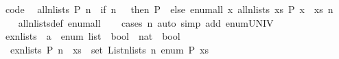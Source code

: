 \begin{isabellebody}
\isanewline
{}\isamarkupfalse%
\ {\isacharbrackleft}{\kern0pt}code{\isacharbrackright}{\kern0pt}{\isacharcolon}{\kern0pt}\isanewline
\ \ {\isachardoublequoteopen}all{\isacharunderscore}{\kern0pt}n{\isacharunderscore}{\kern0pt}lists\ P\ n\ {\isasymlongleftrightarrow}\ {\isacharparenleft}{\kern0pt}if\ n\ {\isacharequal}{\kern0pt}\ {}\ then\ P\ {\isacharbrackleft}{\kern0pt}{\isacharbrackright}{\kern0pt}\ else\ enum{\isacharunderscore}{\kern0pt}all\ {\isacharparenleft}{\kern0pt}{\isacharpercent}{\kern0pt}x{\isachardot}{\kern0pt}\ all{\isacharunderscore}{\kern0pt}n{\isacharunderscore}{\kern0pt}lists\ {\isacharparenleft}{\kern0pt}{\isacharpercent}{\kern0pt}xs{\isachardot}{\kern0pt}\ P\ {\isacharparenleft}{\kern0pt}x\ {\isacharhash}{\kern0pt}\ xs{\isacharparenright}{\kern0pt}{\isacharparenright}{\kern0pt}\ {\isacharparenleft}{\kern0pt}n\ {\isacharminus}{\kern0pt}\ {}{\isacharparenright}{\kern0pt}{\isacharparenright}{\kern0pt}{\isacharparenright}{\kern0pt}{\isachardoublequoteclose}\isanewline
%
\isadelimproof
\ \ %
\endisadelimproof
%
\isatagproof
{}\isamarkupfalse%
\ all{\isacharunderscore}{\kern0pt}n{\isacharunderscore}{\kern0pt}lists{\isacharunderscore}{\kern0pt}def\ enum{\isacharunderscore}{\kern0pt}all\isanewline
\ \ \isamarkupfalse%
\ {\isacharparenleft}{\kern0pt}cases\ n{\isacharparenright}{\kern0pt}\ {\isacharparenleft}{\kern0pt}auto\ simp\ add{\isacharcolon}{\kern0pt}\ enum{\isacharunderscore}{\kern0pt}UNIV{\isacharparenright}{\kern0pt}%
\endisatagproof
{\isafoldproof}%
%
\isadelimproof
\isanewline
%
\endisadelimproof
\isanewline
{}\isamarkupfalse%
\ ex{\isacharunderscore}{\kern0pt}n{\isacharunderscore}{\kern0pt}lists\ {\isacharcolon}{\kern0pt}{\isacharcolon}{\kern0pt}\ {\isachardoublequoteopen}{\isacharparenleft}{\kern0pt}{\isacharparenleft}{\kern0pt}{\isacharprime}{\kern0pt}a\ {\isacharcolon}{\kern0pt}{\isacharcolon}{\kern0pt}\ enum{\isacharparenright}{\kern0pt}\ list\ {\isasymRightarrow}\ bool{\isacharparenright}{\kern0pt}\ {\isasymRightarrow}\ nat\ {\isasymRightarrow}\ bool{\isachardoublequoteclose}\isanewline
{}\isanewline
\ \ {\isachardoublequoteopen}ex{\isacharunderscore}{\kern0pt}n{\isacharunderscore}{\kern0pt}lists\ P\ n\ {\isasymlongleftrightarrow}\ {\isacharparenleft}{\kern0pt}{\isasymexists}xs\ {\isasymin}\ set\ {\isacharparenleft}{\kern0pt}List{\isachardot}{\kern0pt}n{\isacharunderscore}{\kern0pt}lists\ n\ enum{\isacharparenright}{\kern0pt}{\isachardot}{\kern0pt}\ P\ xs{\isacharparenright}{\kern0pt}{\isachardoublequoteclose}\isanewline

\end{isabellebody}
